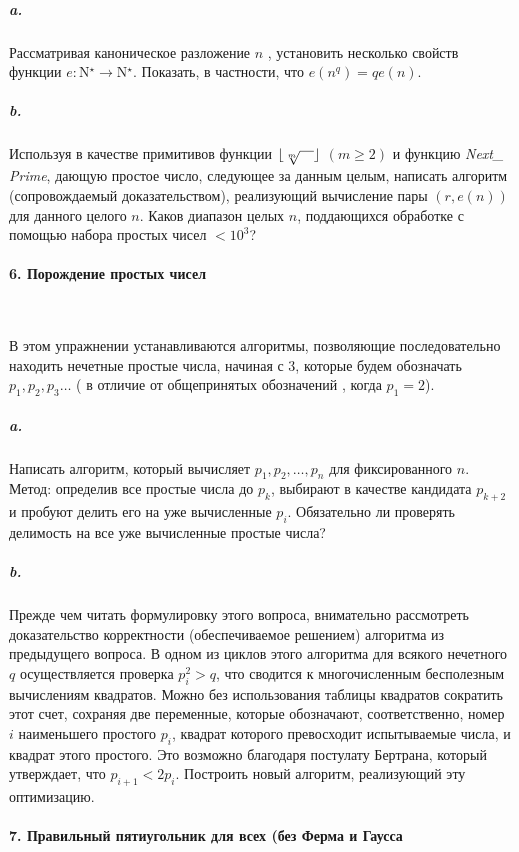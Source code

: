 \documentclass{mai_book}
\begin{document}
\subparagraph { a.} Рассматривая каноническое разложение $n$ , установить несколько свойств функции $e:$N$^\star\rightarrow $N$^\star$. Показать, в частности, что $e\left({n^{q}}\right)=qe\left({n}\right)$.

\subparagraph { b.} Используя в качестве примитивов функции $\lfloor{\sqrt[m]{\hspace*{10pt}}}\rfloor$ $\left({m\geq {2}}\right)$ и функцию \textit{Next\_ Prime}, дающую простое число, следующее за данным целым, написать алгоритм (сопровождаемый доказательством), реализующий вычисление пары $\left({r,e\left({n}\right)}\right)$  для данного целого $n$. Каков диапазон целых $n$, поддающихся обработке с помощью набора простых чисел $<10^{3}$? 

\paragraph { 6. Порождение простых чисел}\ \newline

В этом упражнении устанавливаются алгоритмы, позволяющие последовательно находить нечетные простые числа, начиная с 3, которые будем обозначать $p_{1},p_{2},p_{3} \ldots $ ( в отличие от общепринятых обозначений , когда $p_{1}=2$). 

\subparagraph { a.} Написать алгоритм, который вычисляет $p_{1},p_{2},\ldots ,p_{n} $ для фиксированного $n$. Метод: определив все простые числа до $p_{k}$, выбирают в качестве кандидата $p_{k+2}$ и пробуют делить его на уже вычисленные $p_{i}$. Обязательно ли проверять делимость на все уже вычисленные простые числа?

\newpage
	

\subparagraph { b.} Прежде чем читать формулировку этого вопроса, внимательно рассмотреть доказательство корректности (обеспечиваемое решением) алгоритма из предыдущего вопроса. В одном из циклов этого алгоритма для всякого нечетного $q$ осуществляется проверка $p_i^2>q$, что сводится к многочисленным бесполезным вычислениям квадратов. Можно без использования таблицы квадратов сократить этот счет, сохраняя две переменные, которые обозначают, соответственно, номер $i$ наименьшего простого $p_{i}$, квадрат которого превосходит испытываемые числа, и квадрат этого простого. Это возможно благодаря постулату Бертрана, который утверждает, что $p_{i+1}<2p_{i}$. Построить новый алгоритм, реализующий эту оптимизацию. 

\paragraph { 7. Правильный пятиугольник для всех (без Ферма и Гаусса}\ \newline
\end{document}
